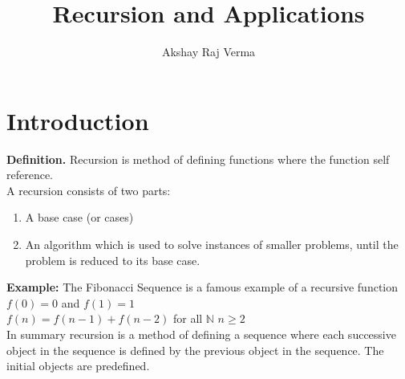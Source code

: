 \documentclass{article}
\begin{document}
\lstset{language=C}
\title{Recursion and Applications}
\author{Akshay Raj Verma}
\maketitle
\section{Introduction}
{\bf Definition.} Recursion is method of defining functions where the function self reference. 
\\
A recursion consists of two parts:
\begin{enumerate}
	\item A base case (or cases)
	\item An algorithm which is used to solve instances of smaller problems, until the problem is reduced to its base case.   
\end{enumerate}
{\bf Example:} The Fibonacci Sequence is a famous example of a recursive function\\
\hspace{10mm}{\bf Base Case:}  \hspace{10mm}$f(0)=0$ and $f(1)=1$
\\
\hspace{10mm}{\bf Formula:} \hspace{11mm} $f(n)=f(n-1)+f(n-2)$ for all $\mathbb{N}$ $ n \geq 2$
\\
In summary recursion is a method of defining a sequence where each successive object in the sequence is defined by the previous object in the sequence.  The initial objects are predefined.
\end{document}
